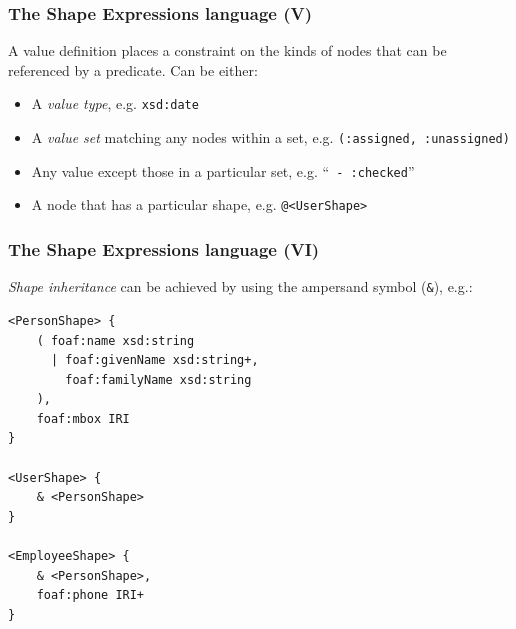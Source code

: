 \documentclass{beamer}
\begin{document}
\begin{frame}[fragile]
  \frametitle{The Shape Expressions language (V)}

  A value definition places a constraint on the kinds of nodes that can
    be referenced by a predicate. Can be either:

  \begin{itemize}
    \item A \textit{value type}, e.g. \texttt{xsd:date}

    \pause

    \item A \textit{value set} matching any nodes within a set, e.g.
      \texttt{(:assigned, :unassigned)}

    \pause

    \item Any value except those in a particular set, e.g.  ``\texttt{ -
      :checked}''

    \pause

    \item A node that has a particular shape, e.g. \texttt{@<UserShape>}
  \end{itemize}
\end{frame}

\begin{frame}[fragile]
  \frametitle{The Shape Expressions language (VI)}

  \textit{Shape inheritance} can be achieved by using the ampersand symbol
  (\texttt{\&}), e.g.:

  \begin{Verbatim}[fontsize=\scriptsize]
<PersonShape> {
    ( foaf:name xsd:string
      | foaf:givenName xsd:string+,
        foaf:familyName xsd:string
    ),
    foaf:mbox IRI
}

<UserShape> {
    & <PersonShape>
}

<EmployeeShape> {
    & <PersonShape>,
    foaf:phone IRI+
}
  \end{Verbatim}
\end{frame}
\end{document}
